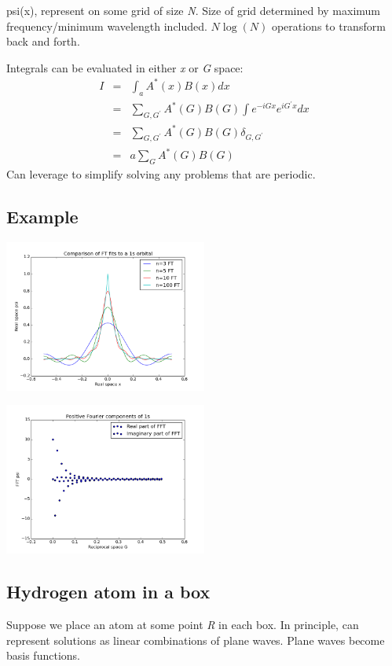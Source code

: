 \documentclass[11pt]{article}
\begin{document}
psi(x)\), represent on some grid of size \emph{N}.  Size of grid determined by maximum frequency/minimum wavelength included.  \(N\log(N)\) operations to transform back and forth.

Integrals can be evaluated in either \emph{x} or \emph{G} space:
\begin{eqnarray}
I & = & \int_a A^*(x) B(x) d x \\
  & = & \sum_{G,G^\prime} A^*(G) B(G) \int e^{-iGx}e^{iG^\prime x} dx \\
  & = & \sum_{G,G^\prime} A^*(G) B(G) \delta_{G,G^\prime} \\
  & = & a \sum_G A^*(G) B(G)
\end{eqnarray}
Can leverage to simplify solving any problems that are periodic.

\subsection{Example}
\label{sec:orgc91c2ed}
\begin{center}
\includegraphics[width=0.5\textwidth]{./Images/real.png}
\end{center}   \begin{center}
\includegraphics[width=0.5\textwidth]{./Images/fft.png}
\end{center}

\subsection{Hydrogen atom in a box}
\label{sec:org48c2d1a}
Suppose we place an atom at some point \emph{R} in each box.  In principle, can  represent solutions as linear combinations of plane waves.  Plane waves become basis functions. 
\end{document}
